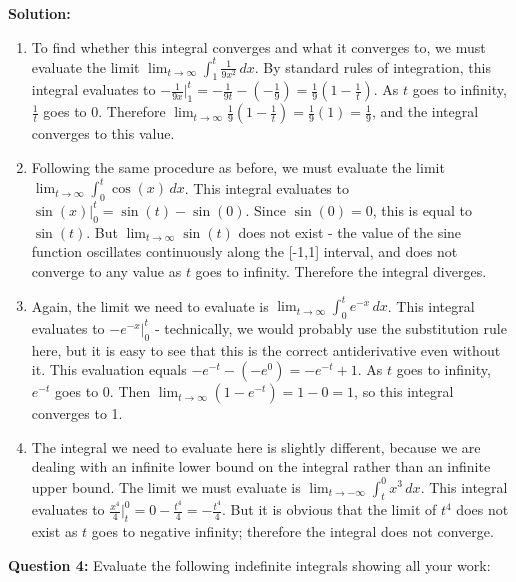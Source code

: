 \documentclass[12pt]{article}
\begin{document}
\noindent \textbf{Solution:}
\begin{enumerate}
\item To find whether this integral converges and what it converges to, we must evaluate the limit $\lim_{t \to \infty} \int_1^t \frac{1}{9x^2} \, dx$. By standard rules of integration, this integral evaluates to $-\frac{1}{9x} \bigg|_1^t = -\frac{1}{9t} - (-\frac{1}{9}) = \frac{1}{9}(1-\frac{1}{t})$. As $t$ goes to infinity, $\frac{1}{t}$ goes to 0. Therefore $\lim_{t \to \infty} \frac{1}{9}(1-\frac{1}{t}) = \frac{1}{9}(1) = \frac{1}{9}$, and the integral converges to this value.
\medskip
\item Following the same procedure as before, we must evaluate the limit $\lim_{t \to \infty} \int_0^t \cos(x) \, dx$. This integral evaluates to $\sin(x) \bigg|_0^t = \sin(t) - \sin(0)$. Since $\sin(0) = 0$, this is equal to $\sin(t)$. But $\lim_{t \to \infty} \sin(t)$ does not exist - the value of the sine function oscillates continuously along the [-1,1] interval, and does not converge to any value as $t$ goes to infinity. Therefore the integral diverges.
\medskip
\item Again, the limit we need to evaluate is $\lim_{t \to \infty} \int_0^t e^{-x} \, dx$. This integral evaluates to $-e^{-x} \bigg|_0^t$ - technically, we would probably use the substitution rule here, but it is easy to see that this is the correct antiderivative even without it. This evaluation equals $-e^{-t} - (-e^0) = -e^{-t} + 1$. As $t$ goes to infinity, $e^{-t}$ goes to 0. Then $\lim_{t \to \infty} (1 - e^{-t}) = 1 - 0 = 1$, so this integral converges to 1.
\medskip
\item The integral we need to evaluate here is slightly different, because we are dealing with an infinite lower bound on the integral rather than an infinite upper bound. The limit we must evaluate is $\lim_{t \to -\infty} \int_t^0 x^3 \, dx$. This integral evaluates to $\frac{x^4}{4} \bigg|_t^0 = 0 - \frac{t^4}{4} = -\frac{t^4}{4}$. But it is obvious that the limit of $t^4$ does not exist as $t$ goes to negative infinity; therefore the integral does not converge.

\end{enumerate}

\noindent \textbf{Question 4:} Evaluate the following indefinite integrals showing all your work:
\end{document}
